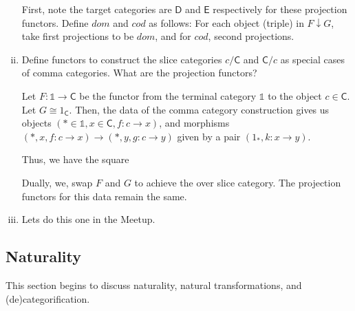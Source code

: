 \documentclass[10pt, oneside]{article}   	%
\newcommand{\cat}[1]{\bm{ \mathsf{#1} }}
\newcommand{\cc}{\cat{C}}
\newcommand{\dd}{\cat{D}}
\newcommand{\ee}{\cat{E}}
\newcommand{\one}{\mathbb{1}}
\begin{document}
\begin{enumerate}[(i)]
First, note the target categories are $\dd$ and $\ee$ respectively for these projection functors. Define $dom$ and $cod$ as follows: For each object (triple) in $F \downarrow G$, take first projections to be $dom$, and for $cod$, second projections. 

\item Define functors to construct the slice categories $c / \cc$ and $\cc / c$ as special cases of comma categories. What are the projection functors?

Let $F : \one \to \cc$ be the functor from the terminal category $\one$ to the object $c \in \cc$. Let $G \cong 1_{\cc}$. Then, the data of the comma category construction gives us objects $(* \in \one, x \in \cc, f : c \to x)$, and morphisms $(*, x, f: c \to x) \to (*, y, g: c \to y)$ given by a pair $(1_*, k: x \to y)$. 

Thus, we have the square

\begin{center}
\end{center}

Dually, we, swap $F$ and $G$ to achieve the over slice category. The projection functors for this data  remain the same. 

\item Lets do this one in the Meetup.
\end{enumerate}

\subsection{Naturality}

This section begins to discuss naturality, natural transformations, and (de)categorification. 
\end{document}
